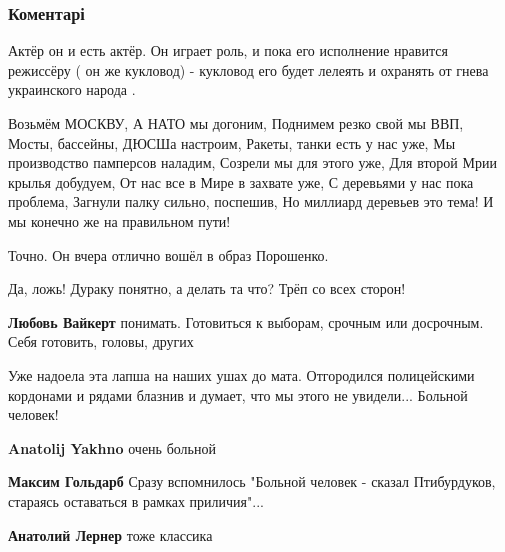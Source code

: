  
 
 
 
 
\subsubsection{Коментарі}

\begin{itemize} %

Актёр он и есть актёр. Он играет роль, и пока его исполнение нравится режиссёру
( он же кукловод) - кукловод его будет лелеять и охранять от гнева украинского
народа .


\obeycr
Возьмём МОСКВУ,
А НАТО мы догоним,
Поднимем резко свой мы ВВП,
Мосты, бассейны, ДЮСШа настроим,
Ракеты, танки есть у нас уже,
Мы производство памперсов наладим,
Созрели мы для этого уже,
Для второй Мрии крылья добудуем,
От нас все в Мире в захвате уже,
С деревьями у нас пока проблема,
Загнули палку сильно, поспешив,
Но миллиард деревьев это тема!
И мы конечно же на правильном пути!
\restorecr

Точно. Он вчера отлично вошёл в образ Порошенко.

Да, ложь! Дураку понятно, а делать та что? Трёп со всех сторон!

\begin{itemize} %
\textbf{Любовь Вайкерт} понимать. Готовиться к выборам, срочным или досрочным. Себя готовить, головы, других
\end{itemize} %


Уже надоела эта лапша на наших ушах до мата. Отгородился полицейскими кордонами
и рядами блазнив и думает, что мы этого не увидели... Больной человек!

\begin{itemize} %
\textbf{Anatolij Yakhno} очень больной

\textbf{Максим Гольдарб} Сразу вспомнилось "Больной человек - сказал Птибурдуков, стараясь оставаться в рамках приличия"...

\textbf{Анатолий Лернер} тоже классика
\end{itemize} %

\end{itemize} %
